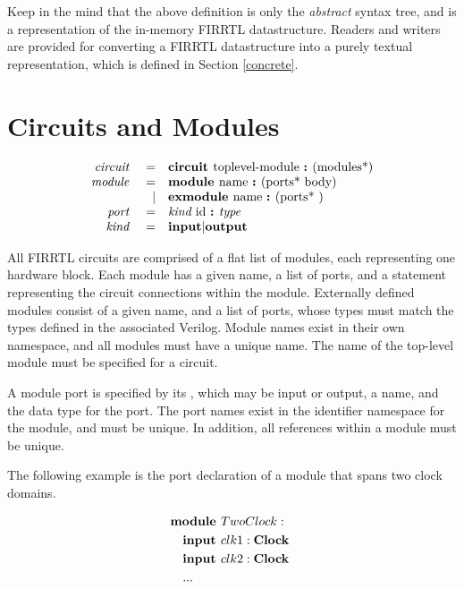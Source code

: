 \documentclass[12pt]{article}
\begin{document}
Keep in the mind that the above definition is only the {\em abstract} syntax tree, and is a representation of the in-memory FIRRTL datastructure.
Readers and writers are provided for converting a FIRRTL datastructure into a purely textual representation, which is defined in Section \ref{concrete}.


\section{Circuits and Modules}
\[
\begin{array}{rrl}
\text{\em circuit\ }    &=     &\text{\bf circuit\ } \text{toplevel-module } \text{\bf :\ } (\text{modules*}) \\
\text{\em module\ }     &=     &\text{\bf module\ }  \text{name } \text{\bf :\ } (\text{ports* } \text{body}) \\
                &\vert &\text{\bf exmodule\ }  \text{name } \text{\bf :\ } (\text{ports* })           \\ 
\text{\em port\ }       &=     &\text{\em kind\ } \text{id } \text{\bf :\ } \text{\em type\ }                                 \\
\text{\em kind\ }       &=     &\text{\bf input} \vert \text{\bf output}                                \\
\end{array}
\]

All FIRRTL circuits are comprised of a flat list of modules, each representing one hardware block.
Each module has a given name, a list of ports, and a statement representing the circuit connections within the module.
Externally defined modules consist of a given name, and a list of ports, whose types must match the types defined in the associated Verilog.
Module names exist in their own namespace, and all modules must have a unique name. The name of the top-level module must be specified for a circuit.

A module port is specified by its , which may be input or output, a name, and the data type for the port.
The port names exist in the identifier namespace for the module, and must be unique.
In addition, all references within a module must be unique.

The following example is the port declaration of a module that spans two clock domains.

\[
\begin{aligned}
&\text{\bf module\ } TwoClock : \\
&\quad \text{\bf input\ } clk1 : \text{\bf Clock\ }\\
&\quad \text{\bf input\ } clk2 : \text{\bf Clock\ }\\
&\quad ... \\
\end{aligned}
\]
\end{document}
